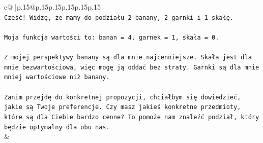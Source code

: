 \documentclass{article}
\begin{document}
{\begin{supertabular}{c@{$\;$}|p{.15\linewidth}@{}p{.15\linewidth}p{.15\linewidth}p{.15\linewidth}p{.15\linewidth}p{.15\linewidth}}
{{{\\ 
\texttt{Cześć! Widzę, że mamy do podziału 2 banany, 2 garnki i 1 skałę.} \\
\\ 
\texttt{Moja funkcja wartości to: banan = 4, garnek = 1, skała = 0.} \\
\\ 
\texttt{Z mojej perspektywy banany są dla mnie najcenniejsze. Skała jest dla mnie bezwartościowa, więc mogę ją oddać bez straty. Garnki są dla mnie mniej wartościowe niż banany.} \\
\\ 
\texttt{Zanim przejdę do konkretnej propozycji, chciałbym się dowiedzieć, jakie są Twoje preferencje. Czy masz jakieś konkretne przedmioty, które są dla Ciebie bardzo cenne? To pomoże nam znaleźć podział, który będzie optymalny dla obu nas.} \\
            }
        }
    }
    & \\ \\


\end{supertabular}}
\end{document}

